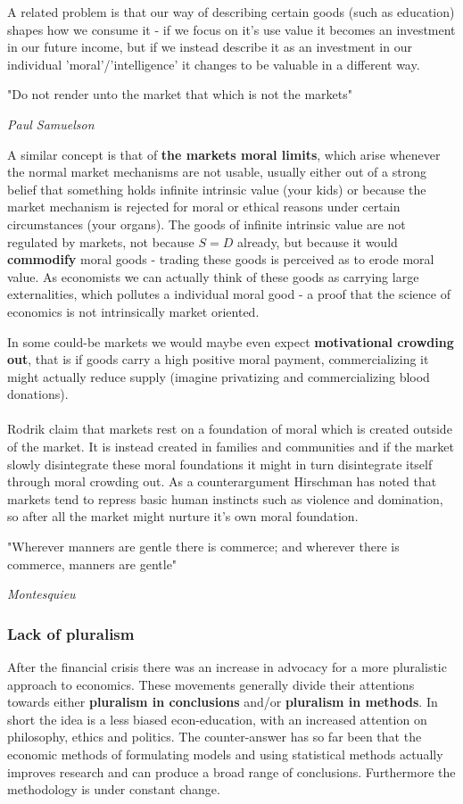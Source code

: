 \documentclass[12pt, a4paper]{article}
\begin{document}
\begin{multicols}{2}
A related problem is that our way of describing certain goods (such as education) shapes how we consume it - if we focus on it's use value it becomes an investment in our future income, but if we instead describe it as an investment in our individual 'moral'/'intelligence' it changes to be valuable in a different way.
\epigraph{"Do not render unto the market that which is not the markets"}{\textit{Paul Samuelson}}
A similar concept is that of \textbf{the markets moral limits}, which arise whenever the normal market mechanisms are not usable, usually either out of a strong belief that something holds infinite intrinsic value (your kids) or because the market mechanism is rejected for moral or ethical reasons under certain circumstances (your organs). The goods of infinite intrinsic value are not regulated by markets, not because $S=D$ already, but because it would \textbf{commodify} moral goods - trading these goods is perceived as to erode moral value. As economists we can actually think of these goods as carrying large externalities, which pollutes a individual moral good - a proof that the science of economics is not intrinsically market oriented.

In some could-be markets we would maybe even expect \textbf{motivational crowding out}, that is if goods carry a high positive moral payment, commercializing it might actually reduce supply (imagine privatizing and commercializing blood donations).
\\ \\
Rodrik claim that markets rest on a foundation of moral which is created outside of the market. It is instead created in families and communities and if the market slowly disintegrate these moral foundations it might in turn disintegrate itself through moral crowding out. As a counterargument Hirschman has noted that markets tend to repress basic human instincts such as violence and domination, so after all the market might nurture it's own moral foundation.

\epigraph{"Wherever manners are gentle there is commerce; and wherever there is commerce, manners are gentle"}{\textit{Montesquieu}}

\subsubsection{Lack of pluralism}
After the financial crisis there was an increase in advocacy for a more pluralistic approach to economics. These movements generally divide their attentions towards either \textbf{pluralism in conclusions} and/or \textbf{pluralism in methods}. In short the idea is a less biased econ-education, with an increased attention on philosophy, ethics and politics. The counter-answer has so far been that the economic methods of formulating models and using statistical methods actually improves research and can produce a broad range of conclusions. Furthermore the methodology is under constant change. 


\end{multicols}
\end{document}
